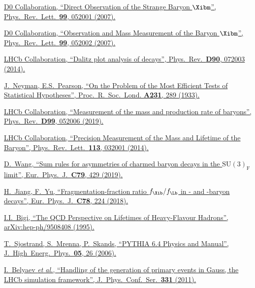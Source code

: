 \href{https://doi.org/10.1103/PhysRevLett.99.052001}{D0 Collaboration, \enquote{Direct Observation of the Strange \bquark Baryon $\Xibm$}, Phys.\ Rev.\ Lett.\ \textbf{99}, 052001 (2007).}

\href{https://doi.org/10.1103/PhysRevLett.99.052002}{D0 Collaboration, \enquote{Observation and Mass Measurement of the Baryon $\Xibm$}, Phys.\ Rev.\ Lett.\ \textbf{99}, 052002 (2007).}

\href{https://doi.org/10.1103/PhysRevD.90.072003}{LHCb Collaboration, \enquote{Dalitz plot analysis of \decay{\Bsb}{\Dzb\Km\pip} decays}, Phys.\ Rev.\ \textbf{D90}, 072003 (2014).}

\href{https://www.jstor.org/stable/91247}{J.~Neyman, E.S.~Pearson, \enquote{On the Problem of the Most Efficient Tests of Statistical Hypotheses}, 	Proc.\ R.\ Soc.\ Lond. \textbf{A231}, 289 (1933).}

\href{https://doi.org/10.1103/PhysRevD.99.052006}{LHCb Collaboration, \enquote{Measurement of the mass and production rate of \Xibm baryons}, Phys.\ Rev.\ \textbf{D99}, 052006 (2019).}

\href{https://doi.org/10.1103/PhysRevLett.113.032001}{LHCb Collaboration, \enquote{Precision Measurement of the Mass and Lifetime of the \Xibz Baryon}, Phys.\ Rev.\ Lett.\ \textbf{113}, 032001 (2014).}

\href{https://doi.org/10.1140/epjc/s10052-019-6925-y}{D.~Wang, \enquote{Sum rules for \CP asymmetries of charmed baryon decays in the $\mathrm{SU}(3)_\mathrm{F}$ limit}, Eur.\ Phys.\ J.\ \textbf{C79}, 429 (2019).}

\href{https://doi.org/10.1140/epjc/s10052-018-5704-5}{H.~Jiang, F.~Yu, \enquote{Fragmentation-fraction ratio $f_{\Xib}/f_{\Lb}$ in \bquark- and \cquark-baryon decays}, Eur.\ Phys.\ J.\ \textbf{C78}, 224 (2018).}

\href{https://arxiv.org/abs/hep-ph/9508408}{I.I.~Bigi, \enquote{The QCD Perspective on Lifetimes of Heavy-Flavour Hadrons}, arXiv:hep-ph/9508408 (1995).}

\href{https://doi.org/10.1088/1126-6708/2006/05/026}{T.~Sjostrand, S.~Mrenna, P.~Skands, \enquote{PYTHIA 6.4 Physics and Manual}, J.\ High\ Energ.\ Phys.\ \textbf{05}, 26 (2006).}

\href{https://doi.org/10.1088/1742-6596/331/3/032047}{I.~Belyaev \textit{et al.}, \enquote{Handling of the generation of primary events in Gauss, the LHCb simulation framework}, J.\ Phys.\ Conf.\ Ser.\ \textbf{331} (2011).}

